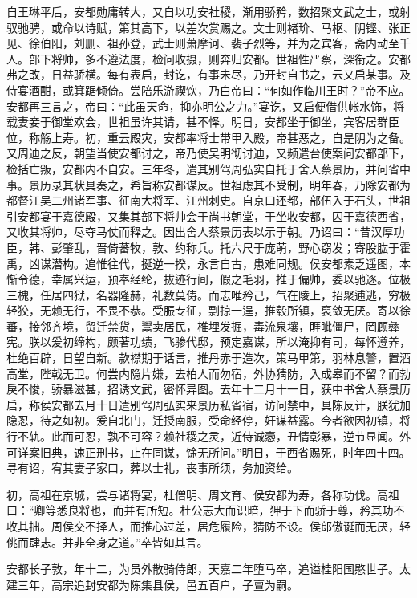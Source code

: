 \documentclass[]{article}
\begin{document}
自王琳平后，安都勋庸转大，又自以功安社稷，渐用骄矜，数招聚文武之士，或射驭驰骋，或命以诗赋，第其高下，以差次赏赐之。文士则褚玠、马枢、阴铿、张正见、徐伯阳，刘删、祖孙登，武士则萧摩诃、裴子烈等，并为之宾客，斋内动至千人。部下将帅，多不遵法度，检问收摄，则奔归安都。世祖性严察，深衔之。安都弗之改，日益骄横。每有表启，封讫，有事未尽，乃开封自书之，云又启某事。及侍宴酒酣，或箕踞倾倚。尝陪乐游禊饮，乃白帝曰：``何如作临川王时？''帝不应。安都再三言之，帝曰：``此虽天命，抑亦明公之力。''宴讫，又启便借供帐水饰，将载妻妾于御堂欢会，世祖虽许其请，甚不怿。明日，安都坐于御坐，宾客居群臣位，称觞上寿。初，重云殿灾，安都率将士带甲入殿，帝甚恶之，自是阴为之备。又周迪之反，朝望当使安都讨之，帝乃使吴明彻讨迪，又频遣台使案问安都部下，检括亡叛，安都内不自安。三年冬，遣其别驾周弘实自托于舍人蔡景历，并问省中事。景历录其状具奏之，希旨称安都谋反。世祖虑其不受制，明年春，乃除安都为都督江吴二州诸军事、征南大将军、江州刺史。自京口还都，部伍入于石头，世祖引安都宴于嘉德殿，又集其部下将帅会于尚书朝堂，于坐收安都，囚于嘉德西省，又收其将帅，尽夺马仗而释之。因出舍人蔡景历表以示于朝。乃诏曰：``昔汉厚功臣，韩、彭肇乱，晋倚蕃牧，敦、约称兵。托六尺于庞萌，野心窃发；寄股肱于霍禹，凶谋潜构。追惟往代，挻逆一揆，永言自古，患难同规。侯安都素乏遥图，本惭令德，幸属兴运，预奉经纶，拔迹行间，假之毛羽，推于偏帅，委以驰逐。位极三槐，任居四狱，名器隆赫，礼数莫俦。而志唯矜己，气在陵上，招聚逋逃，穷极轻狡，无赖无行，不畏不恭。受脤专征，剽掠一逞，推毂所镇，裒敛无厌。寄以徐蕃，接邻齐境，贸迁禁货，鬻卖居民，椎埋发掘，毒流泉壤，睚眦僵尸，罔顾彝宪。朕以爰初缔构，颇著功绩，飞骖代邸，预定嘉谋，所以淹抑有司，每怀遵养，杜绝百辟，日望自新。款襟期于话言，推丹赤于造次，策马甲第，羽林息警，置酒高堂，陛戟无卫。何尝内隐片嫌，去柏人而勿宿，外协猜防，入成皋而不留？而勃戾不悛，骄暴滋甚，招诱文武，密怀异图。去年十二月十一日，获中书舍人蔡景历启，称侯安都去月十日遣别驾周弘实来景历私省宿，访问禁中，具陈反计，朕犹加隐忍，待之如初。爰自北门，迁授南服，受命经停，奸谋益露。今者欲因初镇，将行不轨。此而可忍，孰不可容？赖社稷之灵，近侍诚悫，丑情彰暴，逆节显闻。外可详案旧典，速正刑书，止在同谋，馀无所问。''明日，于西省赐死，时年四十四。寻有诏，宥其妻子家口，葬以士礼，丧事所须，务加资给。

初，高祖在京城，尝与诸将宴，杜僧明、周文育、侯安都为寿，各称功伐。高祖曰：``卿等悉良将也，而并有所短。杜公志大而识暗，狎于下而骄于尊，矜其功不收其拙。周侯交不择人，而推心过差，居危履险，猜防不设。侯郎傲诞而无厌，轻佻而肆志。并非全身之道。''卒皆如其言。

安都长子敦，年十二，为员外散骑侍郎，天嘉二年堕马卒，追谥桂阳国愍世子。太建三年，高宗追封安都为陈集县侯，邑五百户，子亶为嗣。
\end{document}
